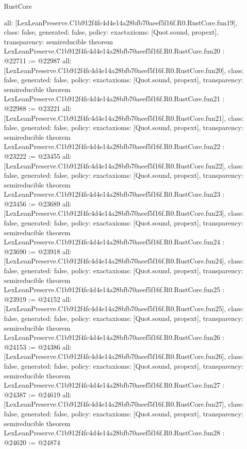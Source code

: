 \begin{lexlean}{RustCore}
\begin{coremodule}
{  all: [LexLeanPreserve.C1b912f4fc4d4e14a28bfb70aeef5f16f.R0.RustCore.fun19],
  class: false,
  generated: false,
  policy: exact{axioms: [Quot.sound, propext]},
  transparency: semireducible
}
theorem LexLeanPreserve.C1b912f4fc4d4e14a28bfb70aeef5f16f.R0.RustCore.fun20 : @22711 := @22987 {
  all: [LexLeanPreserve.C1b912f4fc4d4e14a28bfb70aeef5f16f.R0.RustCore.fun20],
  class: false,
  generated: false,
  policy: exact{axioms: [Quot.sound, propext]},
  transparency: semireducible
}
theorem LexLeanPreserve.C1b912f4fc4d4e14a28bfb70aeef5f16f.R0.RustCore.fun21 : @22988 := @23221 {
  all: [LexLeanPreserve.C1b912f4fc4d4e14a28bfb70aeef5f16f.R0.RustCore.fun21],
  class: false,
  generated: false,
  policy: exact{axioms: [Quot.sound, propext]},
  transparency: semireducible
}
theorem LexLeanPreserve.C1b912f4fc4d4e14a28bfb70aeef5f16f.R0.RustCore.fun22 : @23222 := @23455 {
  all: [LexLeanPreserve.C1b912f4fc4d4e14a28bfb70aeef5f16f.R0.RustCore.fun22],
  class: false,
  generated: false,
  policy: exact{axioms: [Quot.sound, propext]},
  transparency: semireducible
}
theorem LexLeanPreserve.C1b912f4fc4d4e14a28bfb70aeef5f16f.R0.RustCore.fun23 : @23456 := @23689 {
  all: [LexLeanPreserve.C1b912f4fc4d4e14a28bfb70aeef5f16f.R0.RustCore.fun23],
  class: false,
  generated: false,
  policy: exact{axioms: [Quot.sound, propext]},
  transparency: semireducible
}
theorem LexLeanPreserve.C1b912f4fc4d4e14a28bfb70aeef5f16f.R0.RustCore.fun24 : @23690 := @23918 {
  all: [LexLeanPreserve.C1b912f4fc4d4e14a28bfb70aeef5f16f.R0.RustCore.fun24],
  class: false,
  generated: false,
  policy: exact{axioms: [Quot.sound, propext]},
  transparency: semireducible
}
theorem LexLeanPreserve.C1b912f4fc4d4e14a28bfb70aeef5f16f.R0.RustCore.fun25 : @23919 := @24152 {
  all: [LexLeanPreserve.C1b912f4fc4d4e14a28bfb70aeef5f16f.R0.RustCore.fun25],
  class: false,
  generated: false,
  policy: exact{axioms: [Quot.sound, propext]},
  transparency: semireducible
}
theorem LexLeanPreserve.C1b912f4fc4d4e14a28bfb70aeef5f16f.R0.RustCore.fun26 : @24153 := @24386 {
  all: [LexLeanPreserve.C1b912f4fc4d4e14a28bfb70aeef5f16f.R0.RustCore.fun26],
  class: false,
  generated: false,
  policy: exact{axioms: [Quot.sound, propext]},
  transparency: semireducible
}
theorem LexLeanPreserve.C1b912f4fc4d4e14a28bfb70aeef5f16f.R0.RustCore.fun27 : @24387 := @24619 {
  all: [LexLeanPreserve.C1b912f4fc4d4e14a28bfb70aeef5f16f.R0.RustCore.fun27],
  class: false,
  generated: false,
  policy: exact{axioms: [Quot.sound, propext]},
  transparency: semireducible
}
theorem LexLeanPreserve.C1b912f4fc4d4e14a28bfb70aeef5f16f.R0.RustCore.fun28 : @24620 := @24874 {
}
\end{coremodule}
\end{lexlean}
